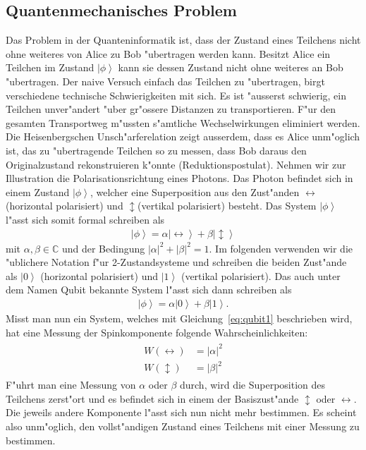 \begin{refsection}
\subsection{Quantenmechanisches Problem}
Das Problem in der Quanteninformatik ist, dass der Zustand eines Teilchens nicht ohne weiteres von Alice zu Bob "ubertragen werden kann. Besitzt Alice ein Teilchen im Zustand $\left|\phi\right\rangle$ kann sie dessen Zustand nicht ohne weiteres an Bob "ubertragen. Der naive Versuch einfach das Teilchen zu "ubertragen, birgt verschiedene technische Schwierigkeiten mit sich. Es ist "ausserst schwierig, ein Teilchen unver"andert "uber gr"ossere Distanzen zu transportieren. F"ur den gesamten Transportweg m"ussten s"amtliche Wechselwirkungen eliminiert werden. 
\\
Die Heisenbergschen Unsch"arferelation zeigt ausserdem, dass es Alice unm"oglich ist, das zu "ubertragende Teilchen so zu messen, dass Bob daraus den Originalzustand rekonstruieren k"onnte (Reduktionspostulat). Nehmen wir zur Illustration die Polarisationsrichtung eines Photons. Das Photon befindet sich in einem Zustand $\left|\phi\right\rangle$, welcher eine Superposition aus den Zust"anden $\leftrightarrow$ (horizontal polarisiert) und $\updownarrow$(vertikal polarisiert) besteht. Das System $\left|\phi\right\rangle$ l"asst sich somit formal schreiben als
\begin{align}\label{eq:qubit1}
\left|\phi\right\rangle = \alpha\left|\leftrightarrow\right\rangle + \beta\left|\updownarrow\right\rangle 
\end{align}
mit $\alpha, \beta \in \mathbb{C}$ und der Bedingung $\left|\alpha\right|^{2} + \left|\beta\right|^{2} = 1$. Im folgenden verwenden wir die "ublichere Notation f"ur 2-Zustandsysteme und schreiben die beiden Zust"ande als $\left| 0 \right\rangle$ (horizontal polarisiert) und $\left| 1 \right\rangle$ (vertikal polarisiert). Das auch unter dem Namen Qubit bekannte System l"asst sich dann schreiben als 
\begin{align}\label{eq:qubit2}
\left|\phi\right\rangle = \alpha\left|0\right\rangle + \beta\left|1\right\rangle.
\end{align}
Misst man nun ein System, welches mit Gleichung~\ref{eq:qubit1} beschrieben wird, hat eine Messung der Spinkomponente folgende Wahrscheinlichkeiten:
\begin{align}
	\begin{split}
		W\left(\leftrightarrow\right) & =\left|\alpha\right|^2  \\
	    W\left(\updownarrow\right) & =\left|\beta\right|^2
	\end{split}
\end{align}
F"uhrt man eine Messung von $\alpha$ oder $\beta$ durch, wird die Superposition des Teilchens zerst"ort und es befindet sich in einem der Basiszust"ande $\updownarrow$ oder $\leftrightarrow$. Die jeweils andere Komponente l"asst sich nun nicht mehr bestimmen. Es scheint also unm"oglich, den vollst"andigen Zustand eines Teilchens mit einer Messung zu bestimmen.

\end{refsection}
